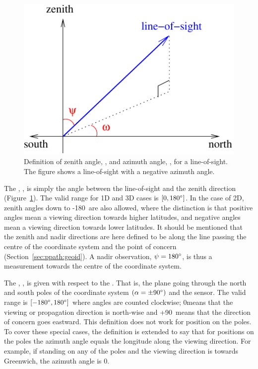 \begin{figure}[!t]
 \begin{center}
  \begin{minipage}[c]{0.6\textwidth}
   \includegraphics*[width=0.99\hsize]{za_and_aa_angles}
  \end{minipage}%
  \begin{minipage}[c]{0.4\textwidth}
   \caption{Definition of zenith angle, \ZntAng, and azimuth angle, 
       \AzmAng, for a line-of-sight. The figure shows a line-of-sight
       with a negative azimuth angle.}
   \label{fig:fm_defs:los}
  \end{minipage}
 \end{center}
\end{figure}           
 
The , \ZntAng, is simply the angle between the
line-of-sight and the zenith direction (Figure~\ref{fig:fm_defs:los}).
The valid range for 1D and 3D cases is $[0,180^\circ]$. In the case
of 2D, zenith angles down to -180\degree\ are also allowed, where the
distinction is that positive angles mean a viewing direction towards
higher latitudes, and negative angles mean a viewing direction towards
lower latitudes. It should be mentioned that the zenith and nadir
directions are here defined to be along the line passing the centre of
the coordinate system and the point of concern
(Section~\ref{sec:ppath:geoid}). A nadir observation,
$\psi=180^\circ$, is thus a measurement towards the centre of the
coordinate system.

The , \AzmAng, is given with respect to the
.  That is, the plane going through the
north and south poles of the coordinate system $(\alpha=\pm90^\circ)$
and the sensor. The valid range is $[-180^\circ,180^\circ]$ where
angles are counted clockwise; 0\degree means that the viewing or
propagation direction is north-wise and +90\degree\ means that the
direction of concern goes eastward. This definition does not work for
position on the poles. To cover these special cases, the definition is
extended to say that for positions on the poles the azimuth angle
equals the longitude along the viewing direction. For example, if
standing on any of the poles and the viewing direction is towards
Greenwich, the azimuth angle is 0\degree.

